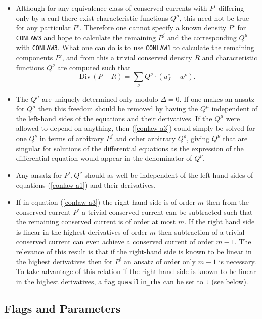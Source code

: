 \begin{itemize}
\item Although for any equivalence class of conserved currents with
  $P^i$ differing only by a curl there exist characteristic functions
  $Q^{\mu}$, this need not be true for any particular $P^i$.
  Therefore one cannot specify a known density $P^i$ for
  \texttt{CONLAW3} and hope to calculate the remaining $P^j$ and the
  corresponding $Q^{\mu}$ with \texttt{CONLAW3}.  What one can do is
  to use \texttt{CONLAW1} to calculate the remaining components $P^j$,
  and from this a trivial conserved density $R$ and characteristic
  functions $Q^{\nu}$ are computed such that
\[ \text{Div}\,(P-R) = \sum_{\nu} Q^{\nu}\cdot (u^{\nu}_J - w^{\nu}). \]

\item The $Q^{\mu}$ are uniquely determined only modulo $\Delta=0$.
  If one makes an ansatz for $Q^{\mu}$ then this freedom should be
  removed by having the $Q^{\mu}$ independent of the left-hand sides
  of the equations and their derivatives.  If the $Q^{\mu}$ were
  allowed to depend on anything, then (\ref{conlaw-a3}) could simply
  be solved for one $Q^{\nu}$ in terms of arbitrary $P^j$ and other
  arbitrary $Q^{\rho}$, giving $Q^{\nu}$ that are singular for
  solutions of the differential equations as the expression of the
  differential equation would appear in the denominator of $Q^{\nu}$.

\item Any ansatz for $P^i,Q^{\nu}$ should as well be independent of
  the left-hand sides of equations (\ref{conlaw-a1}) and their
  derivatives.

\item If in equation (\ref{conlaw-a3}) the right-hand side is of order
  $m$ then from the conserved current $P^i$ a trivial conserved
  current can be subtracted such that the remaining conserved current
  is of order at most $m$.  If the right hand side is linear in the
  highest derivatives of order $m$ then subtraction of a trivial
  conserved current can even achieve a conserved current of order
  $m-1$.  The relevance of this result is that if the right-hand side
  is known to be linear in the highest derivatives then for $P^i$ an
  ansatz of order only $m-1$ is necessary.  To take advantage of this
  relation if the right-hand side is known to be linear in the highest
  derivatives, a flag \texttt{quasilin\_rhs} can be set to \texttt{t}
  (see below).

\end{itemize}

\subsection{Flags and Parameters}

